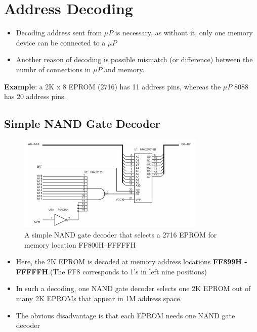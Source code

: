\section{Address Decoding}
\begin{itemize}
  \item Decoding address sent from $\mu P$ is necessary, as without it, only one memory device can be connected to a $\mu P$
  \item Another reason of decoding is possible mismatch (or difference) between the numbr of connections in $\mu P$ and memory.

\end{itemize}
\textbf{Example}: a 2K x 8 EPROM (2716) has 11 address pins, whereas the $\mu P$ 8088 has 20 address pins.
\subsection{Simple NAND Gate Decoder}

\begin{figure}[h!]
  \includegraphics[width = 0.8\textwidth]{./figures/NAND_decoder.png}
  \caption{A simple NAND gate decoder that selects a 2716 EPROM for memory location FF800H–FFFFFH}
  \label{}
\end{figure}
\begin{itemize}
  \item Here, the 2K EPROM is decoded at memory address locations \textbf{FF899H - FFFFFH}.(The FF8 corresponds to 1's in left nine positions)
  \item In such a decoding, one NAND gate decoder selects one 2K EPROM out of many 2K EPROMs that appear in 1M address space.
  \item The obvious disadvantage is that each EPROM needs one NAND gate decoder
\end{itemize}

